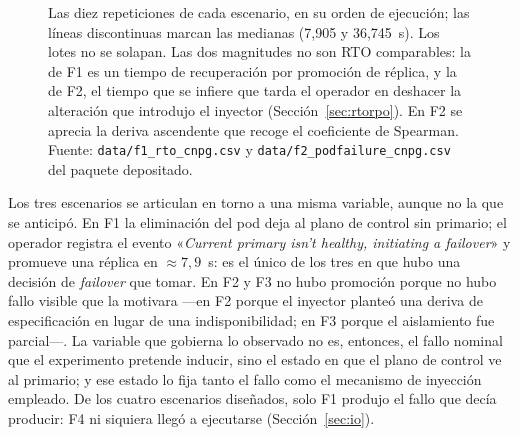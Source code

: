 \documentclass[12pt,twocolumn,letterpaper]{article}
\begin{document}
\begin{figure}[tb]
\centering
{}
\caption{Las diez repeticiones de cada escenario, en su orden de ejecución; las líneas
discontinuas marcan las medianas (7,905 y 36,745~s). Los lotes no se solapan. Las dos magnitudes no
son RTO comparables: la de F1 es un tiempo de recuperación por promoción de réplica, y la de F2,
el tiempo que se infiere que tarda el operador en deshacer la alteración que introdujo el inyector
(Sección~\ref{sec:rtorpo}). En F2 se aprecia la deriva ascendente que recoge el coeficiente de
Spearman. Fuente: \texttt{data/f1\_rto\_cnpg.csv} y
\texttt{data/f2\_podfailure\_\allowbreak cnpg.csv} del paquete depositado.}
\label{fig:timeline}
\end{figure}

Los tres escenarios se articulan en torno a una misma variable, aunque no la que se anticipó. En F1 la eliminación del pod deja al plano de control sin primario; el operador registra el evento «\textit{Current primary isn't healthy, initiating a failover}» y promueve una réplica en $\approx 7{,}9$~s: es el único de los tres en que hubo una decisión de \textit{failover} que tomar. En F2 y F3 no hubo promoción porque no hubo fallo visible que la motivara —en F2 porque el inyector planteó una deriva de especificación en lugar de una indisponibilidad; en F3 porque el aislamiento fue parcial—. La variable que gobierna lo observado no es, entonces, el fallo nominal que el experimento pretende inducir, sino el estado en que el plano de control ve al primario; y ese estado lo fija tanto el fallo como el mecanismo de inyección empleado. De los cuatro escenarios diseñados, solo F1 produjo el fallo que decía producir: F4 ni siquiera llegó a ejecutarse (Sección~\ref{sec:io}).
\end{document}
